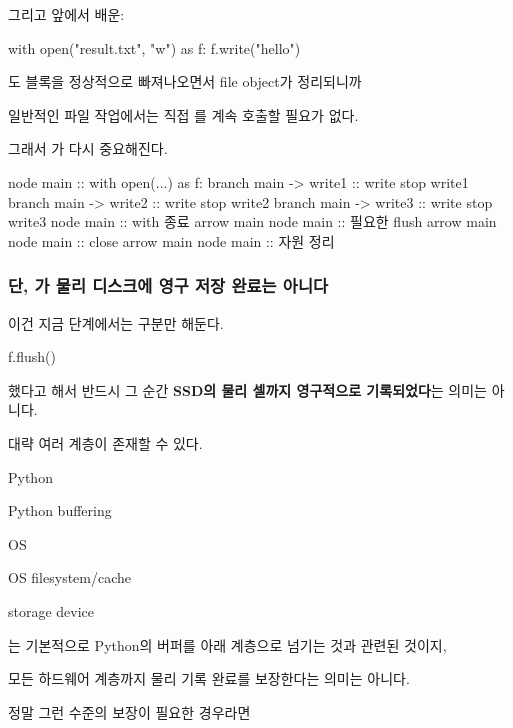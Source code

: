 그리고 앞에서 배운:

\begin{dhkcode}
with open("result.txt", "w") as f:
    f.write("hello")
\end{dhkcode}

도 블록을 정상적으로 빠져나오면서 file object가 정리되니까

일반적인 파일 작업에서는 직접 를 계속 호출할 필요가 없다.

그래서 가 다시 중요해진다.



\begin{dhkbranch}[in=8]
node main :: with open(...) as f:
branch main -> write1 :: write
stop write1
branch main -> write2 :: write
stop write2
branch main -> write3 :: write
stop write3
node main :: with 종료
arrow main
node main :: 필요한 flush
arrow main
node main :: close
arrow main
node main :: 자원 정리
\end{dhkbranch}

\subsubsection{단, 가 물리 디스크에 영구 저장 완료는 아니다}

이건 지금 단계에서는 구분만 해둔다.

\begin{dhkcode}
f.flush()
\end{dhkcode}

했다고 해서 반드시 그 순간 \textbf{SSD의 물리 셀까지 영구적으로 기록되었다}는 의미는 아니다.

대략 여러 계층이 존재할 수 있다.

\begin{dhksmry}[centered]
Python

\da

Python buffering

\da

OS

\da

OS filesystem/cache

\da

storage device
\end{dhksmry}

는 기본적으로 Python의 버퍼를 아래 계층으로 넘기는 것과 관련된 것이지,

모든 하드웨어 계층까지 물리 기록 완료를 보장한다는 의미는 아니다.

정말 그런 수준의 보장이 필요한 경우라면

